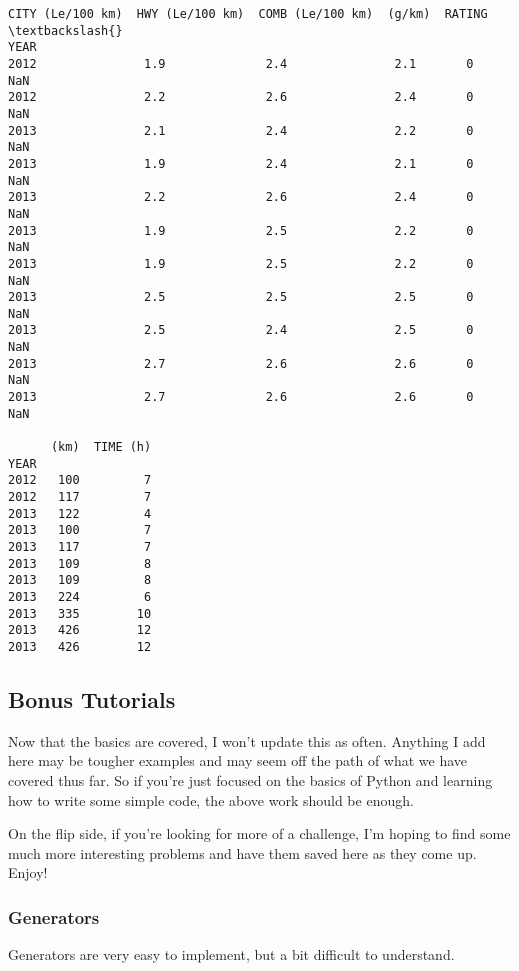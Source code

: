\documentclass[11pt]{article}
\begin{document}
\begin{Verbatim}[commandchars=\\\{\}]
      CITY (Le/100 km)  HWY (Le/100 km)  COMB (Le/100 km)  (g/km)  RATING  \textbackslash{}
YEAR                                                                        
2012               1.9              2.4               2.1       0     NaN   
2012               2.2              2.6               2.4       0     NaN   
2013               2.1              2.4               2.2       0     NaN   
2013               1.9              2.4               2.1       0     NaN   
2013               2.2              2.6               2.4       0     NaN   
2013               1.9              2.5               2.2       0     NaN   
2013               1.9              2.5               2.2       0     NaN   
2013               2.5              2.5               2.5       0     NaN   
2013               2.5              2.4               2.5       0     NaN   
2013               2.7              2.6               2.6       0     NaN   
2013               2.7              2.6               2.6       0     NaN   

      (km)  TIME (h)  
YEAR                  
2012   100         7  
2012   117         7  
2013   122         4  
2013   100         7  
2013   117         7  
2013   109         8  
2013   109         8  
2013   224         6  
2013   335        10  
2013   426        12  
2013   426        12  

    \end{Verbatim}

    \subsection{Bonus Tutorials}\label{bonus-tutorials}

Now that the basics are covered, I won't update this as often. Anything
I add here may be tougher examples and may seem off the path of what we
have covered thus far. So if you're just focused on the basics of Python
and learning how to write some simple code, the above work should be
enough.

On the flip side, if you're looking for more of a challenge, I'm hoping
to find some much more interesting problems and have them saved here as
they come up. Enjoy!

\subsubsection{Generators}\label{generators}

Generators are very easy to implement, but a bit difficult to
understand.
\end{document}

